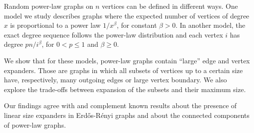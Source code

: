 
Random power-law graphs on $n$ vertices can be defined in different ways.
One model we study describes graphs where the expected number of vertices
of degree $x$ is proportional to a power law $1/x^\beta$, for constant $\beta>0$.
In another model, the exact degree sequence follows the power-law distribution
and each vertex $i$ has degree $pn/i^\beta$, for $0<p\leq 1$ and $\beta\geq 0$.

We show that for these models, power-law graphs contain
``large'' edge and vertex expanders.
Those are graphs in which all subsets of vertices up to a certain size have,
respectively, many outgoing edges or large vertex boundary.
We also explore the trade-offs between expansion of the subsets
and their maximum size.

Our findings agree with and complement known results
about the presence of linear size expanders in Erd\H{o}s-R\'enyi graphs
and about the connected components of power-law graphs.

